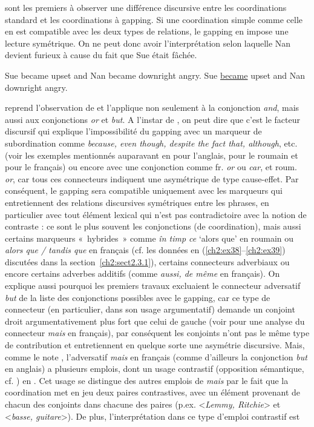 \citet{LevinEtAl1986} sont les premiers à observer une différence discursive entre les coordinations standard et les coordinations à gapping. Si une coordination simple comme celle en  est compatible avec les deux types de relations, le gapping en  impose une lecture symétrique. On ne peut donc avoir l’interprétation selon laquelle Nan devient furieux à cause du fait que Sue était fâchée. 

\ea
\ea Sue became upset and Nan became downright angry. \label{ch2:ex161a}
\ex Sue \uline{became} upset and Nan downright angry. \citep[83]{Kehler2002} \label{ch2:ex161b}  
\z
\z

\citet{Kehler2002} reprend l’observation de \citet{LevinEtAl1986} et l’applique non seulement à la conjonction \textit{and}, mais aussi aux conjonctions \textit{or} et \textit{but}. A l’instar de \citet{Kehler2002}, on peut dire que c’est le facteur discursif qui explique l’impossibilité du gapping avec un marqueur de subordination comme \textit{because, even though, despite the fact that, although}, etc. (voir les exemples mentionnés auparavant en  pour l’anglais,  pour le roumain et  pour le français) ou encore avec une conjonction comme fr. \textit{or} ou \textit{car}, et roum. \textit{or}, car tous ces connecteurs indiquent une  asymétrique de type cause-effet. Par conséquent, le gapping sera compatible uniquement avec les marqueurs qui entretiennent des relations discursives symétriques entre les phrases, en particulier avec tout élément lexical qui n’est pas contradictoire avec la notion de contraste : ce sont le plus souvent les conjonctions (de coordination), mais aussi certains marqueurs «~hybrides~» comme \textit{în timp ce} ‘alors que’ en roumain ou \textit{alors que / tandis que} en français (cf. les données en (\ref{ch2:ex38}--\ref{ch2:ex39}) discutées dans la section~\ref{ch2:sect2.3.1}), certains connecteurs adverbiaux  ou encore certains adverbes additifs (comme \textit{aussi, de même} en français). On explique aussi pourquoi les premiers travaux excluaient le connecteur adversatif \textit{but} de la liste des conjonctions possibles avec le gapping, car ce type de connecteur (en particulier, dans son usage argumentatif) demande un conjoint droit argumentativement plus fort que celui de gauche (voir \citealt{Winterstein2010} pour une analyse du connecteur \textit{mais} en français), par conséquent les conjoints n’ont pas le même type de contribution et entretiennent en quelque sorte une asymétrie discursive. Mais, comme le note \citet{Winterstein2010}, l’adversatif \textit{mais} en français (comme d’ailleurs la conjonction \textit{but} en anglais) a plusieurs emplois, dont un usage contrastif (opposition sémantique, cf. \citealt{Lakoff1971}) en . Cet usage se distingue des autres emplois de \textit{mais} par le fait que la coordination met en jeu deux paires contrastives, avec un élément provenant de chacun des conjoints dans chacune des paires (p.ex. <\textit{Lemmy, Ritchie}> et <\textit{basse, guitare}>). De plus, l’interprétation dans ce type d’emploi contrastif est 